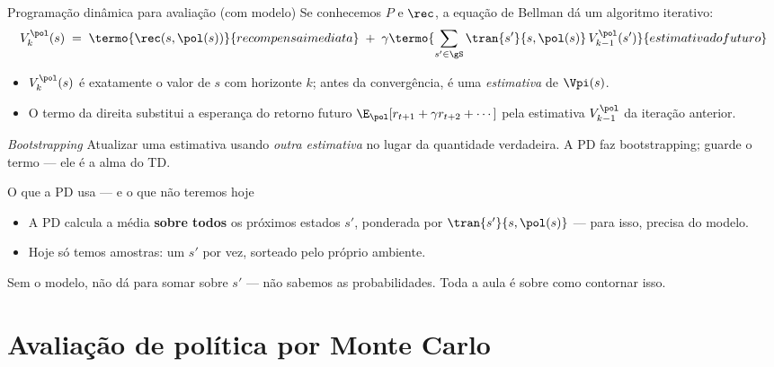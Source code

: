 \documentclass[aspectratio=169, 11pt]{beamer}
\begin{document}
\begin{frame}{Programação dinâmica para avaliação (com modelo)}
  Se conhecemos $P$ e $\rec$, a equação de Bellman dá um algoritmo iterativo:
  \[
    V^{\pol}_{k}(s) \;=\; \termo{\rec(s,\pol(s))}{recompensa imediata}
      \;+\; \gamma \termo{\sum_{s' \in \gS} \tran{s'}{s,\pol(s)}\, V^{\pol}_{k-1}(s')}{estimativa do futuro}
  \]

  \begin{itemize}
    \item $V^{\pol}_k(s)$ é exatamente o valor de $s$ com horizonte $k$;
      antes da convergência, é uma \emph{estimativa} de $\Vpi(s)$.
    \item O termo da direita substitui a esperança do retorno futuro
      $\E_{\pol}[r_{t+1} + \gamma r_{t+2} + \cdots]$ pela estimativa
      $V^{\pol}_{k-1}$ da iteração anterior.
  \end{itemize}

  \begin{defbox}{\emph{Bootstrapping}}
    Atualizar uma estimativa usando \emph{outra estimativa} no lugar da
    quantidade verdadeira. A PD faz bootstrapping; guarde o termo — ele
    é a alma do TD.
  \end{defbox}
\end{frame}

\begin{frame}{O que a PD usa — e o que não teremos hoje}
  \centering
  \backupdiagrama

  \medskip
  \begin{itemize}
    \item A PD calcula a média \textbf{sobre todos} os próximos estados $s'$,
      ponderada por $\tran{s'}{s,\pol(s)}$ — para isso, precisa do modelo.
    \item Hoje só temos \alert{amostras}: um $s'$ por vez, sorteado pelo
      próprio ambiente.
  \end{itemize}

  \begin{alertabox}
    Sem o modelo, não dá para somar sobre $s'$ — não sabemos as
    probabilidades. Toda a aula é sobre como contornar isso.
  \end{alertabox}
\end{frame}

\section{Avaliação de política por Monte Carlo}
\end{document}
